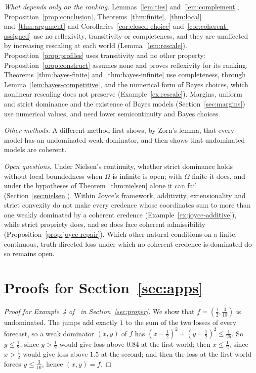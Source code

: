 \documentclass[11pt]{article}
\theoremstyle{definition}
\theoremstyle{remark}
\begin{document}
\emph{What depends only on the ranking.} Lemmas~\ref{lem:ties} and~\ref{lem:complement}, Proposition~\ref{prop:conclusion}, Theorems~\ref{thm:finite},~\ref{thm:local} and~\ref{thm:argument} and Corollaries~\ref{cor:closed-choice} and~\ref{cor:coherent-assigned} use no reflexivity, transitivity or completeness, and they are unaffected by increasing rescaling at each world (Lemma~\ref{lem:rescale}). Proposition~\ref{prop:profiles} uses transitivity and no other property; Proposition~\ref{prop:construct} assumes none and proves reflexivity for its ranking. Theorems~\ref{thm:bayes-finite} and~\ref{thm:bayes-infinite} use completeness, through Lemma~\ref{lem:bayes-competitive}, and the numerical form of Bayes choices, which nonlinear rescaling does not preserve (Example~\ref{ex:rescale}). Margins, uniform and strict dominance and the existence of Bayes models (Section~\ref{sec:margins}) use numerical values, and need lower semicontinuity and Bayes choices.

\emph{Other methods.} A different method first shows, by Zorn's lemma, that every model has an undominated weak dominator, and then shows that undominated models are coherent.

\emph{Open questions.} Under Nielsen's continuity, whether strict dominance holds without local boundedness when $\Omega$ is infinite is open; with $\Omega$ finite it does, and under the hypotheses of Theorem~\ref{thm:nielsen} alone it can fail (Section~\ref{sec:nielsen}). Within Joyce's framework, additivity, extensionality and strict convexity do not make every credence whose coordinates sum to more than one weakly dominated by a coherent credence (Example~\ref{ex:joyce-additive}), while strict propriety does, and so does face coherent admissibility (Proposition~\ref{prop:joyce-repair}). Which other natural conditions on a finite, continuous, truth-directed loss under which no coherent credence is dominated do so remains open.

\appendix
\section{Proofs for Section~\ref{sec:apps}}\label{app:proofs}
\begin{proof}[{Proof for Example~4 of~\cite{SSK09} in Section~\ref{sec:proper}}]
We show that $f=(\frac12,\frac3{10})$ is undominated. The jumps add exactly $1$ to the sum of the two losses of every forecast, so a weak dominator $(x,y)$ of $f$ has $(x-\frac12)^2+(y-\frac12)^2\le\frac1{25}$. So $y\le\frac12$, since $y>\frac12$ would give loss above $0.84$ at the first world; then $x\le\frac12$, since $x>\frac12$ would give loss above $1.5$ at the second; and then the loss at the first world forces $y\le\frac3{10}$, hence $(x,y)=f$.
\end{proof}
\end{document}
